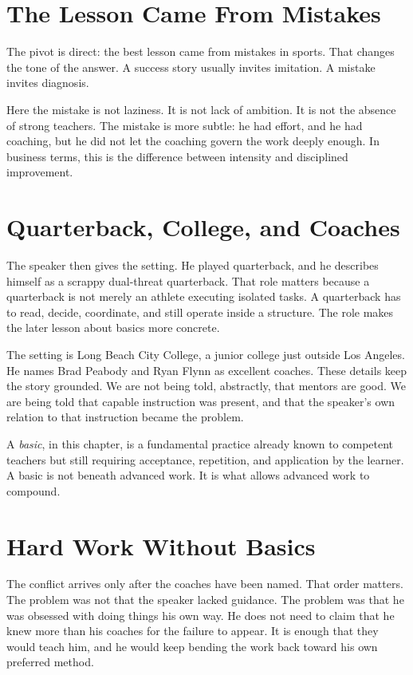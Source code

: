 \section{The Lesson Came From Mistakes}

The pivot is direct: the best lesson came from mistakes in sports. That changes the tone of the answer. A success story usually invites imitation. A mistake invites diagnosis.

Here the mistake is not laziness. It is not lack of ambition. It is not the absence of strong teachers. The mistake is more subtle: he had effort, and he had coaching, but he did not let the coaching govern the work deeply enough. In business terms, this is the difference between intensity and disciplined improvement.

\section{Quarterback, College, and Coaches}

The speaker then gives the setting. He played quarterback, and he describes himself as a scrappy dual-threat quarterback. That role matters because a quarterback is not merely an athlete executing isolated tasks. A quarterback has to read, decide, coordinate, and still operate inside a structure. The role makes the later lesson about basics more concrete.

The setting is Long Beach City College, a junior college just outside Los Angeles. He names Brad Peabody and Ryan Flynn as excellent coaches. These details keep the story grounded. We are not being told, abstractly, that mentors are good. We are being told that capable instruction was present, and that the speaker's own relation to that instruction became the problem.

\begin{definition}
A \emph{basic}, in this chapter, is a fundamental practice already known to competent teachers but still requiring acceptance, repetition, and application by the learner. A basic is not beneath advanced work. It is what allows advanced work to compound.
\end{definition}

\section{Hard Work Without Basics}

The conflict arrives only after the coaches have been named. That order matters. The problem was not that the speaker lacked guidance. The problem was that he was obsessed with doing things his own way. He does not need to claim that he knew more than his coaches for the failure to appear. It is enough that they would teach him, and he would keep bending the work back toward his own preferred method.

